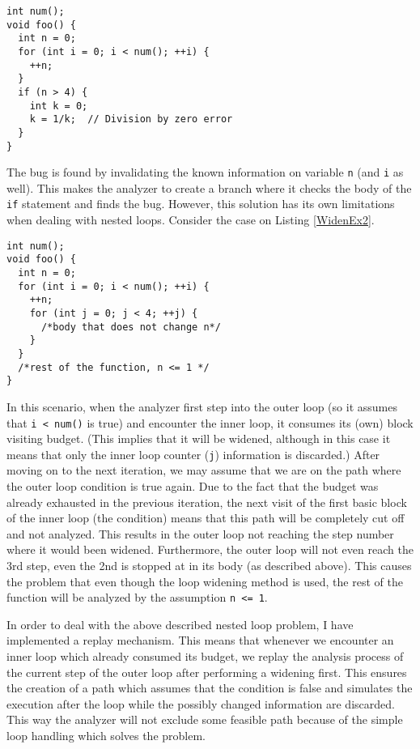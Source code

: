 \begin{lstlisting}
int num();
void foo() {
  int n = 0;
  for (int i = 0; i < num(); ++i) {
    ++n;
  }
  if (n > 4) {
    int k = 0;
    k = 1/k;  // Division by zero error
  }
}\end{lstlisting}

The bug is found by invalidating the known information on variable
\texttt{n} (and \texttt{i} as well). This makes the analyzer to create a 
branch
where it checks the body of the \texttt{if} statement and finds the bug.
However, this solution has its own limitations when dealing with nested 
loops. 
Consider the case on Listing \ref{WidenEx2}.
\begin{lstlisting}
int num();
void foo() {
  int n = 0;
  for (int i = 0; i < num(); ++i) {
    ++n;
    for (int j = 0; j < 4; ++j) {
      /*body that does not change n*/
    }
  }
  /*rest of the function, n <= 1 */
}\end{lstlisting}

In this scenario, when the analyzer first step into the outer loop (so it assumes
that \texttt{i < num()} is true) and encounter the inner loop, it consumes
its (own) block visiting budget. (This implies that it will be widened, although
in this case it means that only the inner loop counter (\texttt{j}) information
is discarded.) After moving on to the next iteration, we may assume that we
are on the path where the outer loop condition is true again. Due to the fact that the budget was already exhausted in the previous iteration, the next visit of the first
basic block of the inner loop (the condition) means that this path will be
completely cut off and not analyzed. This results in the outer loop not reaching the step number where it would been widened. Furthermore, the outer loop
will not even reach the 3rd step, even the 2nd is stopped at in its body
(as described above). This causes the problem that even though the 
loop widening method is used, the rest of the function will be analyzed by the 
assumption \texttt{n <= 1}.

In order to deal with the above described nested loop problem, I have 
implemented a replay mechanism. This means that whenever we encounter an inner 
loop which already consumed its budget, we replay the analysis process of the 
current step of the outer loop after performing a widening first. This ensures
the creation of a path which assumes that the condition is false and simulates 
the execution after the loop while the possibly changed information are 
discarded. This way the analyzer will not exclude some feasible path 
because of the simple loop handling which solves the problem.

